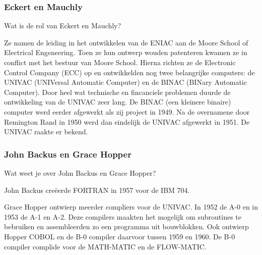 \documentclass[../main.tex]{subfiles}
\begin{document}
\subsubsection{Eckert en Mauchly}
\begin{question}
Wat is de rol van Eckert en Mauchly?
\end{question}
\begin{solution}
Ze namen de leiding in het ontwikkelen van de ENIAC aan de Moore School of Electrical Engeneering.
Toen ze hun ontwerp wouden patenteren kwamen ze in conflict met het bestuur van Moore School.
Hierna richten ze de Electronic Control Company (ECC) op en ontwikkelden nog twee belangrijke computers: de UNIVAC (UNIVersal Automatic Computer) en de BINAC (BINary Automatic Computer).
Door heel wat technische en fincanciele problemen duurde de ontwikkeling van de UNIVAC zeer lang. 
De BINAC (een kleinere binaire) computer werd eerder afgewerkt als zij project in 1949.
Na de overnamene door Remington Rand in 1950 werd dan eindelijk de UNIVAC afgewerkt in 1951. 
De UNIVAC raakte er bekend.
\end{solution}
\subsubsection{John Backus en Grace Hopper}
\begin{question}
Wat weet je over John Backus en Grace Hopper?
\end{question}
\begin{solution}
John Backus cre\"eerde FORTRAN in 1957 voor de IBM 704.

Grace Hopper ontwierp meerder compliers voor de UNIVAC.
In 1952 de A-0 en in 1953 de A-1 en A-2.
Deze compilers maakten het mogelijk om subroutines te bebruiken en assembleerden zo een programma uit bouwblokken.
Ook ontwierp Hopper COBOL en de B-0 compiler daarvoor tussen 1959 en 1960.
De B-0 compiler complide voor de MATH-MATIC en de FLOW-MATIC.
\end{solution}
\end{document}
